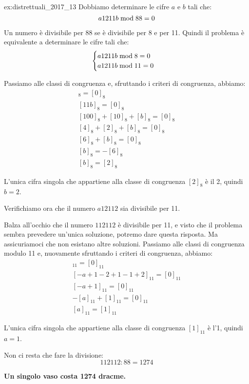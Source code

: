 \begin{soluzione}{ex:distrettuali_2017_13}
    Dobbiamo determinare le cifre $a$ e $b$ tali che:
    \begin{equation*}
        a1211b  \bmod  88 = 0
    \end{equation*}

    Un numero è divisibile per 88 se è divisibile per 8 e per 11.
    Quindi il problema è equivalente a determinare le cifre tali che:
    \begin{equation*}
        \begin{cases}
            a1211b  \bmod  8 = 0 \\
            a1211b  \bmod  11 = 0
        \end{cases}
    \end{equation*}

    Passiamo alle classi di congruenza e, sfruttando i criteri di congruenza, abbiamo:
    \begin{gather*}
        [a1211b]_8 = [0]_8 \\
        [11b]_8 = [0]_8 \\
        [100]_8 + [10]_8 + [b]_8 = [0]_8 \\
        [4]_8 + [2]_8 + [b]_8 = [0]_8 \\
        [6]_8 + [b]_8 = [0]_8 \\
        [b]_8 = -[6]_8 \\
        [b]_8 = [2]_8
    \end{gather*}

    L'unica cifra singola che appartiene alla classe di congruenza $[2]_8$ è il 2, quindi $b = 2$.

    Verifichiamo ora che il numero $a12112$ sia divisibile per 11.

    Balza all'occhio che il numero $112112$ è divisibile per 11, e visto che il problema sembra prevedere un'unica
    soluzione, potremo dare questa risposta.
    Ma assicuriamoci che non esistano altre soluzioni.
    Passiamo alle classi di congruenza modulo 11 e, nuovamente sfruttando i criteri di congruenza, abbiamo:
    \begin{gather*}
        [a12112]_{11} = [0]_{11} \\
        [-a + 1 - 2 + 1 - 1 + 2]_{11} = [0]_{11} \\
        [-a + 1]_{11} = [0]_{11} \\
        -[a]_{11} + [1]_{11} = [0]_{11} \\
        [a]_{11} = [1]_{11}
    \end{gather*}

    L'unica cifra singola che appartiene alla classe di congruenza $[1]_{11}$ è l'1, quindi $a = 1$.

    Non ci resta che fare la divisione:
    \begin{equation*}
        112112 : 88 = 1274
    \end{equation*}

    \textbf{Un singolo vaso costa 1274 dracme.}
\end{soluzione}

